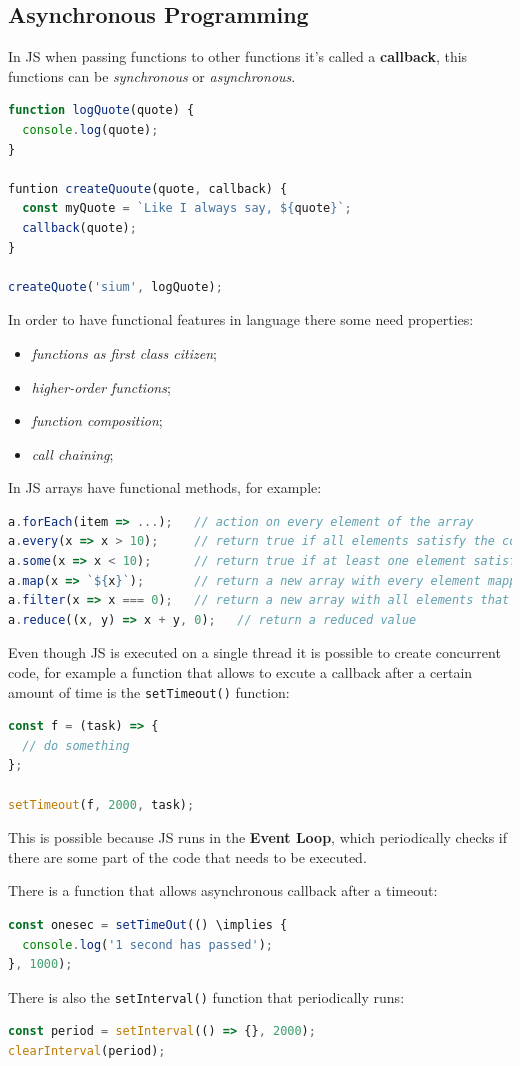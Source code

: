\documentclass[12pt]{article}
\begin{document}
\subsection{Asynchronous Programming}
In JS when passing functions to other functions it's called a \textbf{callback}, this functions can be \emph{synchronous} or \emph{asynchronous}.
\begin{lstlisting}[language=js]
function logQuote(quote) {
  console.log(quote);
}

funtion createQuoute(quote, callback) {
  const myQuote = `Like I always say, ${quote}`;
  callback(quote);
}

createQuote('sium', logQuote);
\end{lstlisting}
In order to have functional features in language there some need properties:
\begin{itemize}
  \item \emph{functions as first class citizen};
  \item \emph{higher-order functions};
  \item \emph{function composition};
  \item \emph{call chaining};
\end{itemize}
In JS arrays have functional methods, for example:
\begin{lstlisting}[language=js]
a.forEach(item => ...);   // action on every element of the array
a.every(x => x > 10);     // return true if all elements satisfy the condition, false otherwise
a.some(x => x < 10);      // return true if at least one element satisfy the condition
a.map(x => `${x}`);       // return a new array with every element mapped to a new one
a.filter(x => x === 0);   // return a new array with all elements that satisfy the condition
a.reduce((x, y) => x + y, 0);   // return a reduced value
\end{lstlisting}
Even though JS is executed on a single thread it is possible to create concurrent code, for example a function that allows to excute a callback after a certain amount of time is the \texttt{setTimeout()} function:
\begin{lstlisting}[language=js]
const f = (task) => {
  // do something
};

setTimeout(f, 2000, task);
\end{lstlisting}
This is possible because JS runs in the \textbf{Event Loop}, which periodically checks if there are some part of the code that needs to be executed.

There is a function that allows asynchronous callback after a timeout:
\begin{lstlisting}[language=js]
const onesec = setTimeOut(() \implies {
  console.log('1 second has passed');
}, 1000);
\end{lstlisting}
There is also the \texttt{setInterval()} function that periodically runs:
\begin{lstlisting}[language=js]
const period = setInterval(() => {}, 2000);
clearInterval(period);
\end{lstlisting}
\end{document}
